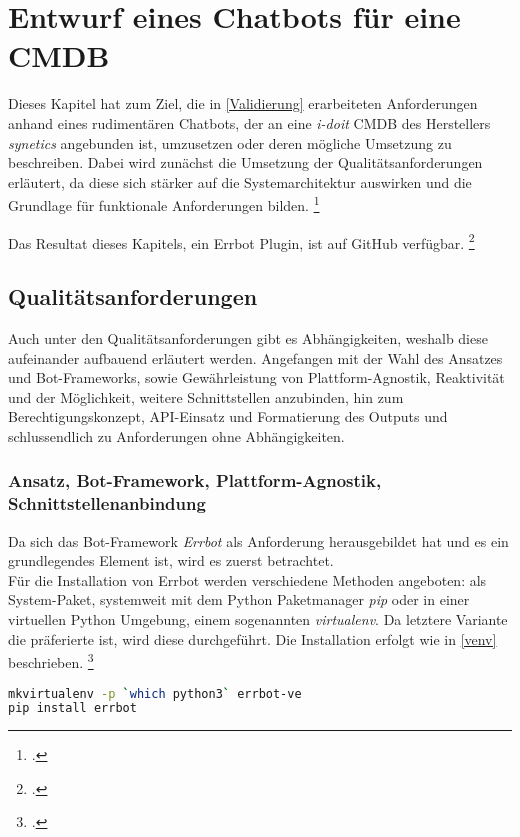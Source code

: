 \chapter{Entwurf eines Chatbots für eine CMDB} \label{Praxis}

Dieses Kapitel hat zum Ziel, die in \autoref{Validierung} erarbeiteten Anforderungen anhand eines rudimentären Chatbots, der an eine \textit{i-doit} \acs{CMDB} des Herstellers \textit{synetics} angebunden ist, umzusetzen oder deren mögliche Umsetzung zu beschreiben. Dabei wird zunächst die Umsetzung der Qualitätsanforderungen erläutert, da diese sich stärker auf die Systemarchitektur auswirken und die Grundlage für funktionale Anforderungen bilden.
\footcite[Vgl.][9]{Pohl_2015_Requirements}

Das Resultat dieses Kapitels, ein Errbot Plugin, ist auf GitHub verfügbar.
\footcite[Vgl.][o. \pno]{Weiss_2019_GitHub}

\section{Qualitätsanforderungen}

Auch unter den Qualitätsanforderungen gibt es Abhängigkeiten, weshalb diese aufeinander aufbauend erläutert werden. Angefangen mit der Wahl des Ansatzes und Bot-Frameworks, sowie Gewährleistung von Plattform-Agnostik, Reaktivität und der Möglichkeit, weitere Schnittstellen anzubinden, hin zum Berechtigungskonzept, API-Einsatz und Formatierung des Outputs und schlussendlich zu Anforderungen ohne Abhängigkeiten. 


\subsection{Ansatz, Bot-Framework, Plattform-Agnostik, Schnittstellenanbindung}

Da sich das Bot-Framework \textit{Errbot} als Anforderung herausgebildet hat und es ein grundlegendes Element ist, wird es zuerst betrachtet.\\
Für die Installation von Errbot werden verschiedene Methoden angeboten: als System-Paket, systemweit mit dem Python Paketmanager \textit{pip} oder in einer virtuellen Python Umgebung, einem sogenannten \textit{virtualenv}. Da letztere Variante die präferierte ist, wird diese durchgeführt. Die Installation erfolgt wie in \autoref{venv} beschrieben.
\footcite[Vgl.][o. \pno]{errbot_2018_setup}

\begin{lstlisting}[language=bash, label=venv, caption=Virtualenv Einrichtung und Errbot Installation]
mkvirtualenv -p `which python3` errbot-ve
pip install errbot
\end{lstlisting}

